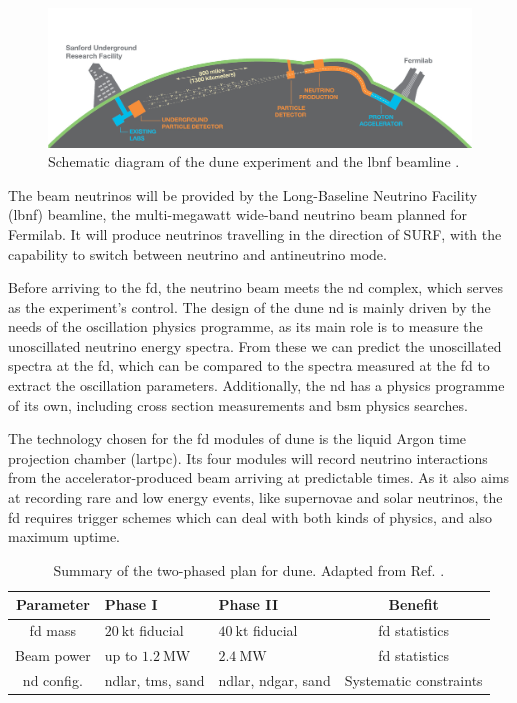 \begin{figure}[t]
	\centering
	\includegraphics[width=0.9\linewidth]{Images/DUNE/FD/dune}
	\caption[Schematic diagram of the \gls{dune} experiment and the \gls{lbnf} beamline.]{Schematic diagram of the \gls{dune} experiment and the \gls{lbnf} beamline \cite{DUNE2020TDR1}.}
	\label{fig:dune}
\end{figure}

The beam neutrinos will be provided by the Long-Baseline Neutrino Facility (\gls{lbnf}) beamline, the multi-megawatt wide-band neutrino beam planned for Fermilab. It will produce neutrinos travelling in the direction of SURF, with the capability to switch between neutrino and antineutrino mode.

Before arriving to the \gls{fd}, the neutrino beam meets the \gls{nd} complex, which serves as the experiment's control. The design of the \gls{dune} \gls{nd} is mainly driven by the needs of the oscillation physics programme, as its main role is to measure the unoscillated neutrino energy spectra. From these we can predict the unoscillated spectra at the \gls{fd}, which can be compared to the spectra measured at the \gls{fd} to extract the oscillation parameters. Additionally, the \gls{nd} has a physics programme of its own, including cross section measurements and \gls{bsm} physics searches.

The technology chosen for the \gls{fd} modules of \gls{dune} is the liquid Argon time projection chamber (\gls{lartpc}). Its four modules will record neutrino interactions from the accelerator-produced beam arriving at predictable times. As it also aims at recording rare and low energy events, like supernovae and solar neutrinos, the \gls{fd} requires trigger schemes which can deal with both kinds of physics, and also maximum uptime.

\begin{table}[]
	\caption[Summary of the two-phased plan for \gls{dune}.]{Summary of the two-phased plan for \gls{dune}. Adapted from Ref. \cite{DUNE2022Snowmass}.}
	\centering
	\begin{tabular}{c|C{3.0cm}|C{3.0cm}|c}
	Parameter  & Phase I                     & Phase II		& Benefit \\[1mm] \hline
	\rule{0pt}{1.1\normalbaselineskip}\gls{fd} mass    & $20 \ \mathrm{kt}$ fiducial & $40 \ \mathrm{kt}$ fiducial & \gls{fd} statistics\\[1mm]
	Beam power & up to $1.2 \ \mathrm{MW}$   & $2.4 \ \mathrm{MW}$      & \gls{fd} statistics  \\[1mm]
	\gls{nd} config.  & \gls{ndlar}, \gls{tms}, \gls{sand}           & \gls{ndlar}, \gls{ndgar}, \gls{sand} & Systematic constraints
	\end{tabular}
	\label{tab:dune_phases}
\end{table}

